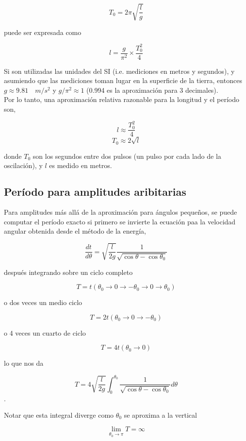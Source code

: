 \documentclass[DIV=calc, paper=a4, fontsize=12pt, twocolumn]{scrartcl}	 %
\begin{document}
$$ T_{0} = 2\pi \sqrt{\frac{l}{g}} $$

puede ser expresada como

$$ l = \frac{g}{\pi^{2}} \times \frac{T_{0}^{2}}{4}$$

\newpage

Si son utilizadas las unidades del SI (i.e. mediciones en metros y segundos), y asumiendo que las mediciones toman lugar en la superficie de la tierra, entonces $g \approx 9.81 \quad m/s^{2}$ y $g/\pi^{2} \approx 1$ (0.994 es la aproximación para 3 decimales).\\

Por lo tanto, una aproximación relativa razonable para la longitud y el período son,

$$l \approx \frac{T_{0}^{2}}{4}$$
$$T_{0} \approx 2\sqrt{l}$$

donde $T_{0}$ son los segundos entre dos pulsos (un pulso por cada lado de la oscilación), y $l$ es medido en metros.

\subsection*{Período para amplitudes aribitarias}
\vspace{0.5cm}

Para amplitudes más allá de la aproximación para ángulos pequeños, se puede computar el período exacto si primero se invierte la ecuación paa la velocidad angular obtenida desde el método de la energía,

$$ \frac{dt}{d\theta} = \sqrt{\frac{l}{2g}}\frac{1}{\sqrt{\cos{\theta}-\cos{\theta_{0}}}}$$

después integrando sobre un ciclo completo

$$ T = t(\theta_{0} \rightarrow 0 \rightarrow -\theta_{0} \rightarrow 0 \rightarrow \theta_{0})$$

o dos veces un medio ciclo

$$T= 2t(\theta_{0} \rightarrow 0 \rightarrow -\theta_{0})$$

o 4 veces un cuarto de ciclo

$$T = 4t(\theta_{0} \rightarrow 0)$$

lo que nos da

$$ T = 4\sqrt{\frac{l}{2g}}\int_{0}^{\theta_{0}}\frac{1}{\sqrt{\cos{\theta}-\cos{\theta_{0}}}}d\theta$$.

Notar que esta integral diverge como $\theta_{0}$ se aproxima a la vertical

$$\lim_{\theta_{0} \to \pi}{T} = \infty$$
\end{document}

